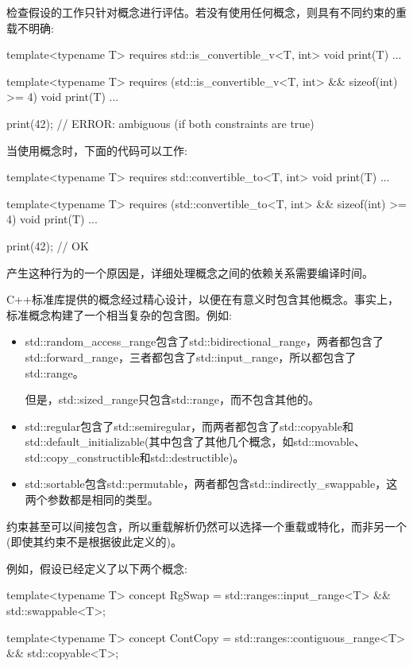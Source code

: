 检查假设的工作只针对概念进行评估。若没有使用任何概念，则具有不同约束的重载不明确:

\begin{cpp}
template<typename T>
requires std::is_convertible_v<T, int>
void print(T) {
	...
}

template<typename T>
requires (std::is_convertible_v<T, int> && sizeof(int) >= 4)
void print(T) {
	...
}

print(42); // ERROR: ambiguous (if both constraints are true)
\end{cpp}

当使用概念时，下面的代码可以工作:

\begin{cpp}
template<typename T>
requires std::convertible_to<T, int>
void print(T) {
	...
}

template<typename T>
requires (std::convertible_to<T, int> && sizeof(int) >= 4)
void print(T) {
	...
}

print(42); // OK
\end{cpp}

产生这种行为的一个原因是，详细处理概念之间的依赖关系需要编译时间。

C++标准库提供的概念经过精心设计，以便在有意义时包含其他概念。事实上，标准概念构建了一个相当复杂的包含图。例如:

\begin{itemize}
\item
std::random\_access\_range包含了std::bidirectional\_range，两者都包含了std::forward\_range，三者都包含了std::input\_range，所以都包含了std::range。

但是，std::sized\_range只包含std::range，而不包含其他的。

\item
std::regular包含了std::semiregular，而两者都包含了std::copyable和std::default\_initializable(其中包含了其他几个概念，如std::movable、std::copy\_constructible和std::destructible)。

\item
std::sortable包含std::permutable，两者都包含std::indirectly\_swappable，这两个参数都是相同的类型。
\end{itemize}


约束甚至可以间接包含，所以重载解析仍然可以选择一个重载或特化，而非另一个(即使其约束不是根据彼此定义的)。

例如，假设已经定义了以下两个概念:

\begin{cpp}
template<typename T>
concept RgSwap = std::ranges::input_range<T> && std::swappable<T>;

template<typename T>
concept ContCopy = std::ranges::contiguous_range<T> && std::copyable<T>;
\end{cpp}

